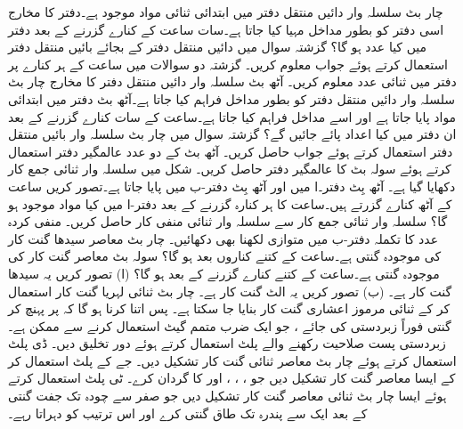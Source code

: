  چار بٹ  سلسلہ وار دائیں منتقل دفتر میں ابتدائی ثنائی مواد   موجود ہے۔دفتر کا مخارج  اسی دفتر کو بطور مداخل مہیا کیا جاتا ہے۔سات ساعت کے کنارے گزرنے کے بعد دفتر میں کیا عدد ہو گا؟
  گزشتہ سوال میں دائیں منتقل دفتر کے بجائے بائیں منتقل دفتر استعمال کرتے ہوئے  جواب معلوم کریں۔
 گزشتہ دو سوالات میں  ساعت  کے ہر کنارے پر دفتر میں ثنائی عدد  معلوم  کریں۔
 آٹھ بٹ  سلسلہ وار دائیں منتقل دفتر کا  مخارج  چار بٹ  سلسلہ وار دائیں منتقل دفتر  کو بطور مداخل فراہم کیا جاتا ہے۔آٹھ بٹ دفتر میں ابتدائی مواد  پایا جاتا ہے  اور  اسے    مداخل  فراہم کیا جاتا ہے۔ساعت کے سات کنارے گزرنے کے بعد ان دفتر  میں کیا اعداد پائے جائیں گے؟
 گزشتہ سوال میں چار بٹ سلسلہ وار بائیں منتقل دفتر استعمال کرتے  ہوئے جواب حاصل کریں۔
 آٹھ بٹ کے دو عدد عالمگیر دفتر استعمال کرتے ہوئے سولہ بٹ کا عالمگیر دفتر حاصل کریں۔
 شکل     میں سلسلہ وار ثنائی جمع کار دکھایا گیا ہے۔ آٹھ بِٹ دفتر۔ا  میں   اور  آٹھ بِٹ دفتر-ب   میں  پایا جاتا ہے۔تصور کریں  ساعت کے آٹھ کنارے گزرتے ہیں۔ساعت کا ہر کنارہ گزرنے کے بعد دفتر-ا میں  کیا مواد موجود ہو گا؟
 سلسلہ وار ثنائی جمع کار سے سلسلہ وار ثنائی منفی کار حاصل کریں۔ منفی  کردہ عدد کا تکملہ  دفتر-ب میں متوازی لکھنا بھی دکھائیں۔
 چار بٹ معاصر سیدھا گنت کار کی موجودہ گنتی   ہے۔ساعت کے کتنے کناروں بعد   ہو گا؟
 سولہ بٹ معاصر گنت کار کی موجودہ گنتی  ہے۔ساعت کے کتنے کنارے گزرنے کے بعد  ہو گا؟ (ا) تصور کریں یہ سیدھا گنت کار ہے۔ (ب) تصور کریں یہ الٹ گنت کار ہے۔
 چار بٹ ثنائی لہریا گنت کار  استعمال کر کے  ثنائی مرموز اعشاری گنت کار  بنایا جا سکتا ہے۔ پس اتنا کرنا ہو گا کہ  پر پہنچ کر  گنتی   فوراً زبردستی  کی جائے ، جو ایک  ضرب متمم گیٹ استعمال  کرنے سے  ممکن ہے۔زبردستی پست صلاحیت رکھنے والے پلٹ استعمال کرتے ہوئے   دور تخلیق دیں۔ 
 ڈی پلٹ استعمال کرتے ہوئے چار بٹ معاصر ثنائی گنت کار تشکیل دیں۔ 
 جے کے پلٹ استعمال کر کے  ایسا معاصر گنت کار تشکیل دیں  جو   ، ، ، اور    کا گردان کرے۔
 ٹی پلٹ استعمال کرتے ہوئے ایسا  چار بٹ ثنائی معاصر گنت کار تشکیل دیں جو صفر   سے چودہ   تک جفت گنتی کے بعد ایک   سے پندرہ   تک طاق گنتی کرے اور اس ترتیب کو دہراتا رہے۔ 
